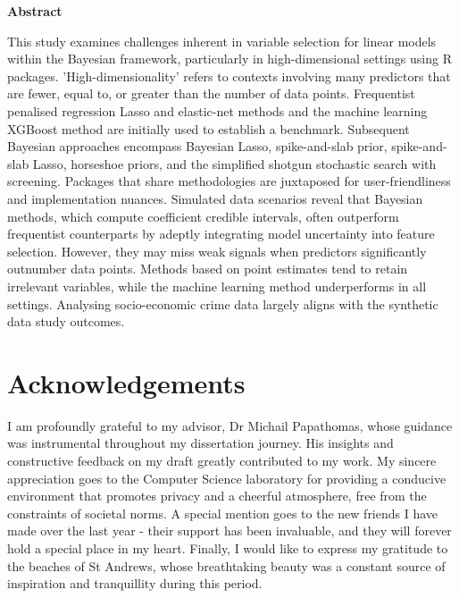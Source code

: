 \documentclass[
  11pt,
]{article}
\author{}
\date{\vspace{-2.5em}}
\begin{document}
\onehalfspacing

\begin{center}
  
  \textbf{\LARGE \textbf{Abstract}}
  
  \noindent 


This study examines challenges inherent in variable selection for linear models within the Bayesian framework, particularly in high-dimensional settings using R packages. 'High-dimensionality' refers to contexts involving many predictors that are fewer, equal to, or greater than the number of data points. Frequentist penalised regression Lasso and elastic-net methods and the machine learning XGBoost method are initially used to establish a benchmark. Subsequent Bayesian approaches encompass Bayesian Lasso, spike-and-slab prior, spike-and-slab Lasso, horseshoe priors, and the simplified shotgun stochastic search with screening. Packages that share methodologies are juxtaposed for user-friendliness and implementation nuances. Simulated data scenarios reveal that Bayesian methods, which compute coefficient credible intervals, often outperform frequentist counterparts by adeptly integrating model uncertainty into feature selection. However, they may miss weak signals when predictors significantly outnumber data points. Methods based on point estimates tend to retain irrelevant variables, while the machine learning method underperforms in all settings. Analysing socio-economic crime data largely aligns with the synthetic data study outcomes.

  \end{center}

\newpage

\section*{\LARGE Acknowledgements}

I am profoundly grateful to my advisor, Dr Michail Papathomas, whose
guidance was instrumental throughout my dissertation journey. His
insights and constructive feedback on my draft greatly contributed to my
work. My sincere appreciation goes to the Computer Science laboratory
for providing a conducive environment that promotes privacy and a
cheerful atmosphere, free from the constraints of societal norms. A
special mention goes to the new friends I have made over the last year -
their support has been invaluable, and they will forever hold a special
place in my heart. Finally, I would like to express my gratitude to the
beaches of St Andrews, whose breathtaking beauty was a constant source
of inspiration and tranquillity during this period.
\end{document}
